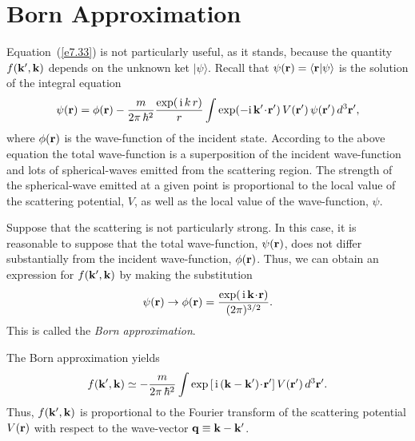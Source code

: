\section{Born Approximation}
Equation~(\ref{e7.33}) is not particularly useful, as it stands, because the
quantity $f({\bf k}', {\bf k})$ depends on the unknown ket $|\psi\rangle$.
Recall that $\psi({\bf r})=\langle {\bf r}|\psi\rangle$
 is the solution of the integral equation
\begin{equation}
\psi({\bf r}) = \phi({\bf r})-\frac{m}{2\pi\,\hbar^2}
 \frac{\exp(\,{\rm i}\,k\,r)}{r}
\int \exp(- {\rm i} \,{\bf k}'\! \cdot \!{\bf r}')\,
V({\bf r}')\, \psi  ({\bf r}')\,d^3{\bf r}',
\end{equation}
where $\phi({\bf r})$ is the wave-function of the incident state. 
According to the above equation the total wave-function is a superposition
of the incident wave-function and lots of spherical-waves emitted from
the scattering region. The strength of the spherical-wave emitted at
a given point is proportional to the local value of the scattering
potential, $V$, as well as the local value of the wave-function, $\psi$.

Suppose that the scattering is not particularly  strong. In this case, it is
reasonable to suppose that the total wave-function, $\psi({\bf r})$, does
not differ substantially from the incident wave-function, $\phi({\bf r})$.
Thus, we can obtain an expression for $f({\bf k}', {\bf k})$ by making
the substitution
\begin{equation}
\psi({\bf r}) \rightarrow \phi({\bf r}) = 
\frac{\exp(\,{\rm i}\,{\bf k}\!\cdot \! {\bf r}  ) }{(2\pi)^{3/2}}.
\end{equation}
This  is called the {\em Born approximation}.

The Born approximation yields
\begin{equation}
f({\bf k}', {\bf k}) \simeq - \frac{m}{2\pi\, \hbar^2} \int \exp\left[\,
{\rm i}\, ({\bf k} - {\bf k}')\!\cdot \!{\bf r}'\right] 
V({\bf r}')\,d^3{\bf r}'.
\end{equation}
Thus, $f({\bf k}', {\bf k})$ is proportional to the Fourier transform
of the scattering potential $V({\bf r})$ with respect to the wave-vector
${\bf q} \equiv {\bf k} - {\bf k}'$.

